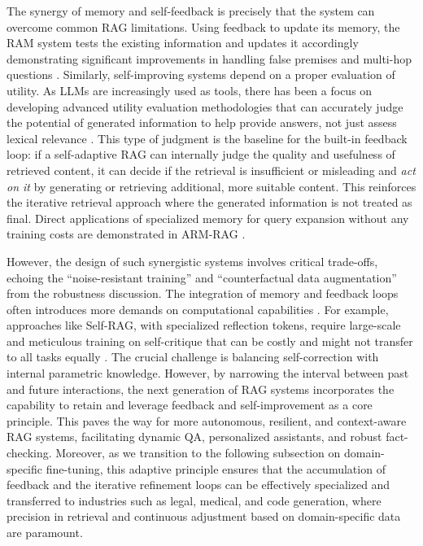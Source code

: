 \documentclass[11pt]{article}
\begin{document}
The synergy of memory and self-feedback is precisely that the system can overcome common RAG limitations. Using feedback to update its memory, the RAM system tests the existing information and updates it accordingly demonstrating significant improvements in handling false premises and multi-hop questions \cite{ref55}. Similarly, self-improving systems depend on a proper evaluation of utility. As LLMs are increasingly used as tools, there has been a focus on developing advanced utility evaluation methodologies that can accurately judge the potential of generated information to help provide answers, not just assess lexical relevance \cite{ref53}. This type of judgment is the baseline for the built-in feedback loop: if a self-adaptive RAG can internally judge the quality and usefulness of retrieved content, it can decide if the retrieval is insufficient or misleading and \emph{act on it} by generating or retrieving additional, more suitable content. This reinforces the iterative retrieval approach where the generated information is not treated as final. Direct applications of specialized memory for query expansion without any training costs are demonstrated in ARM-RAG \cite{ref108}.

However, the design of such synergistic systems involves critical trade-offs, echoing the ``noise-resistant training'' and ``counterfactual data augmentation'' from the robustness discussion. The integration of memory and feedback loops often introduces more demands on computational capabilities \cite{ref55}. For example, approaches like Self-RAG, with specialized reflection tokens, require large-scale and meticulous training on self-critique that can be costly and might not transfer to all tasks equally \cite{ref109}. The crucial challenge is balancing self-correction with internal parametric knowledge. However, by narrowing the interval between past and future interactions, the next generation of RAG systems incorporates the capability to retain and leverage feedback and self-improvement as a core principle. This paves the way for more autonomous, resilient, and context-aware RAG systems, facilitating dynamic QA, personalized assistants, and robust fact-checking. Moreover, as we transition to the following subsection on domain-specific fine-tuning, this adaptive principle ensures that the accumulation of feedback and the iterative refinement loops can be effectively specialized and transferred to industries such as legal, medical, and code generation, where precision in retrieval and continuous adjustment based on domain-specific data are paramount.
\end{document}
